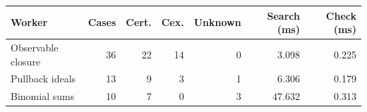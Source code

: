 \begin{tabular}{@{}lrrrrrr@{}}
\toprule
Worker & Cases & Cert. & Cex. & Unknown & Search (ms) & Check (ms) \\
\midrule
Observable closure & 36 & 22 & 14 & 0 & 3.098 & 0.225 \\
Pullback ideals & 13 & 9 & 3 & 1 & 6.306 & 0.179 \\
Binomial sums & 10 & 7 & 0 & 3 & 47.632 & 0.313 \\
\bottomrule
\end{tabular}
